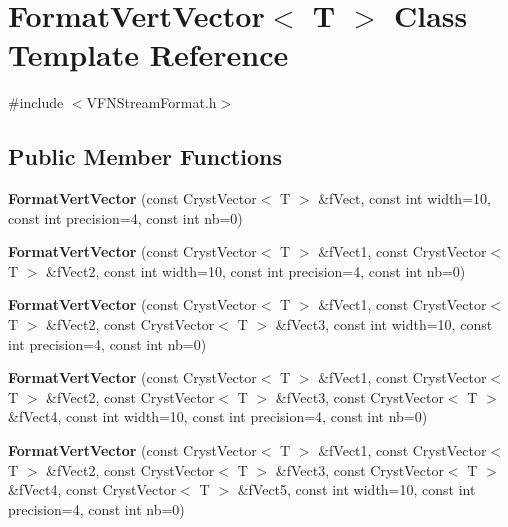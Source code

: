 \hypertarget{class_format_vert_vector}{}\section{Format\+Vert\+Vector$<$ T $>$ Class Template Reference}
\label{class_format_vert_vector}


{\ttfamily \#include $<$V\+F\+N\+Stream\+Format.\+h$>$}

\subsection*{Public Member Functions}
\begin{DoxyCompactItemize}
\item 
\mbox{\label{class_format_vert_vector_ad00b21e4d576ed84da3e9e176ede50c4}} 
{\bfseries Format\+Vert\+Vector} (const Cryst\+Vector$<$ T $>$ \&f\+Vect, const int width=10, const int precision=4, const int nb=0)
\item 
\mbox{\label{class_format_vert_vector_af0a00ffbfb8df916f80ffb1ae5d0a97e}} 
{\bfseries Format\+Vert\+Vector} (const Cryst\+Vector$<$ T $>$ \&f\+Vect1, const Cryst\+Vector$<$ T $>$ \&f\+Vect2, const int width=10, const int precision=4, const int nb=0)
\item 
\mbox{\label{class_format_vert_vector_ab7c4ebbaecc22e76605ef018abce3a0a}} 
{\bfseries Format\+Vert\+Vector} (const Cryst\+Vector$<$ T $>$ \&f\+Vect1, const Cryst\+Vector$<$ T $>$ \&f\+Vect2, const Cryst\+Vector$<$ T $>$ \&f\+Vect3, const int width=10, const int precision=4, const int nb=0)
\item 
\mbox{\label{class_format_vert_vector_aa75d50d4a4332ee29db260f9bc0ea99c}} 
{\bfseries Format\+Vert\+Vector} (const Cryst\+Vector$<$ T $>$ \&f\+Vect1, const Cryst\+Vector$<$ T $>$ \&f\+Vect2, const Cryst\+Vector$<$ T $>$ \&f\+Vect3, const Cryst\+Vector$<$ T $>$ \&f\+Vect4, const int width=10, const int precision=4, const int nb=0)
\item 
\mbox{\label{class_format_vert_vector_a29d19224b8dbb5b4effc0133cfc00b70}} 
{\bfseries Format\+Vert\+Vector} (const Cryst\+Vector$<$ T $>$ \&f\+Vect1, const Cryst\+Vector$<$ T $>$ \&f\+Vect2, const Cryst\+Vector$<$ T $>$ \&f\+Vect3, const Cryst\+Vector$<$ T $>$ \&f\+Vect4, const Cryst\+Vector$<$ T $>$ \&f\+Vect5, const int width=10, const int precision=4, const int nb=0)

\end{DoxyCompactItemize}
